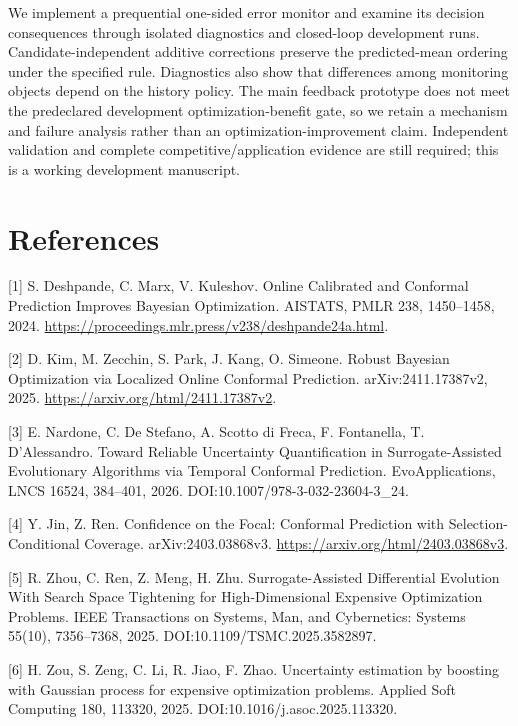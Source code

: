 \documentclass[11pt,a4paper]{article}
\begin{document}
We implement a prequential one-sided error monitor and examine its
decision consequences through isolated diagnostics and closed-loop
development runs. Candidate-independent additive corrections preserve
the predicted-mean ordering under the specified rule. Diagnostics also
show that differences among monitoring objects depend on the history
policy. The main feedback prototype does not meet the predeclared
development optimization-benefit gate, so we retain a mechanism and
failure analysis rather than an optimization-improvement claim.
Independent validation and complete competitive/application evidence are
still required; this is a working development manuscript.

\hypertarget{references}{%
\section{References}\label{references}}

{[}1{]} S. Deshpande, C. Marx, V. Kuleshov. Online Calibrated and
Conformal Prediction Improves Bayesian Optimization. AISTATS, PMLR 238,
1450--1458, 2024.
\url{https://proceedings.mlr.press/v238/deshpande24a.html}.

{[}2{]} D. Kim, M. Zecchin, S. Park, J. Kang, O. Simeone. Robust
Bayesian Optimization via Localized Online Conformal Prediction.
arXiv:2411.17387v2, 2025. \url{https://arxiv.org/html/2411.17387v2}.

{[}3{]} E. Nardone, C. De Stefano, A. Scotto di Freca, F. Fontanella, T.
D'Alessandro. Toward Reliable Uncertainty Quantification in
Surrogate-Assisted Evolutionary Algorithms via Temporal Conformal
Prediction. EvoApplications, LNCS 16524, 384--401, 2026.
DOI:10.1007/978-3-032-23604-3\_24.

{[}4{]} Y. Jin, Z. Ren. Confidence on the Focal: Conformal Prediction
with Selection-Conditional Coverage. arXiv:2403.03868v3.
\url{https://arxiv.org/html/2403.03868v3}.

{[}5{]} R. Zhou, C. Ren, Z. Meng, H. Zhu. Surrogate-Assisted
Differential Evolution With Search Space Tightening for High-Dimensional
Expensive Optimization Problems. IEEE Transactions on Systems, Man, and
Cybernetics: Systems 55(10), 7356--7368, 2025.
DOI:10.1109/TSMC.2025.3582897.

{[}6{]} H. Zou, S. Zeng, C. Li, R. Jiao, F. Zhao. Uncertainty estimation
by boosting with Gaussian process for expensive optimization problems.
Applied Soft Computing 180, 113320, 2025.
DOI:10.1016/j.asoc.2025.113320.
\end{document}
